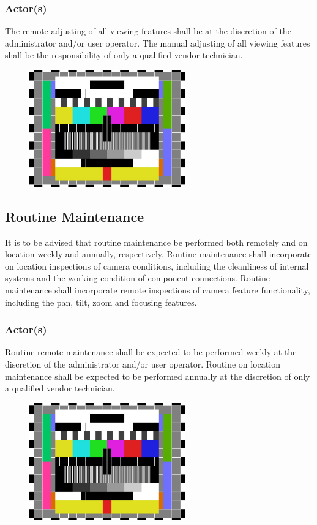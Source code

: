\subsubsection{Actor(s)}
The remote adjusting of all viewing features shall be at the discretion of the administrator and/or user operator.
The manual adjusting of all viewing features shall be the responsibility of only a qualified vendor technician.
\vspace{0.5 in}
\begin{figure}[h!]
	\centering
   	\includegraphics[width=0.60\textwidth]{images/test_image}
\end{figure}
\vspace{0.5 in}
\subsection{Routine Maintenance}
It is to be advised that routine maintenance be performed both remotely and on location weekly and annually, respectively.
Routine maintenance shall incorporate on location inspections of camera conditions, including the cleanliness of internal systems and the working condition of component connections.
Routine maintenance shall incorporate remote inspections of camera feature functionality, including the pan, tilt, zoom and focusing features.
\subsubsection{Actor(s)}
Routine remote maintenance shall be expected to be performed weekly at the discretion of the administrator and/or user operator.
Routine on location maintenance shall be expected to be performed annually at the discretion of only a qualified vendor technician.
\vspace{0.5 in}
\begin{figure}[h!]
	\centering
   	\includegraphics[width=0.60\textwidth]{images/test_image}
\end{figure}
\vspace{0.5 in}
